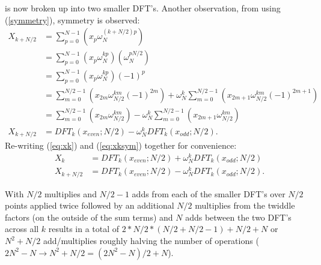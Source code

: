 \documentclass{article}
\begin{document}
%
is now broken up into two smaller DFT's.
Another observation, from using (\ref{symmetry}), symmetry is observed:
%
\begin {equation} \label {eq:xksym}
\begin {aligned}
X_{k + N/2} &= \sum_{p = 0}^{N-1} (x_p \omega_N^{(k + N/2) p}) \\
            &= \sum_{p = 0}^{N-1} (x_p \omega_N^{k p}) (\omega_N^{p N/2}) \\
            &= \sum_{p = 0}^{N-1} (x_p \omega_N^{k p}) (-1)^p \\
            &= \sum_{m = 0}^{N/2-1} (x_{2m} \omega_{N/2}^{k m} (-1)^{2m}) + \omega_N^{k} \sum_{m = 0}^{N/2-1} (x_{2m+1} \omega_{N/2}^{km} (-1)^{2m+1}) \\
            &= \sum_{m = 0}^{N/2-1} (x_{2m} \omega_{N/2}^{k m}) - \omega_N^{k} \sum_{m = 0}^{N/2-1} (x_{2m+1} \omega_{N/2}^{km}) \\
X_{k + N/2} &= DFT_k(x_{even}; N/2) - \omega_N^{k} DFT_k(x_{odd}; N/2).
\end {aligned}
\end {equation}
%
Re-writing (\ref{eq:xk}) and (\ref{eq:xksym}) together for convenience:
%
\begin {equation}
\begin {aligned}
&X_k         &= DFT_k(x_{even}; N/2) + \omega_N^{k} DFT_k(x_{odd}; N/2) \\
&X_{k + N/2} &= DFT_k(x_{even}; N/2) - \omega_N^{k} DFT_k(x_{odd}; N/2).
\end {aligned}
\end {equation}
%

With $N/2$ multiplies and $N/2 - 1$ adds from each of the smaller DFT's over $N/2$ points applied twice followed by an additional $N/2$ multiplies from the twiddle factors (on the outside of the sum terms) and $N$ adds between the two DFT's across all $k$ results in a total of $2 * N/2 * (N/2 + N/2 - 1) + N/2 + N$ or $N^2 + N/2$ add/multiplies roughly halving the number of operations ($2 N^2 - N \rightarrow N^2 + N/2 = (2 N^2 - N) / 2 + N$).
\end{document}
